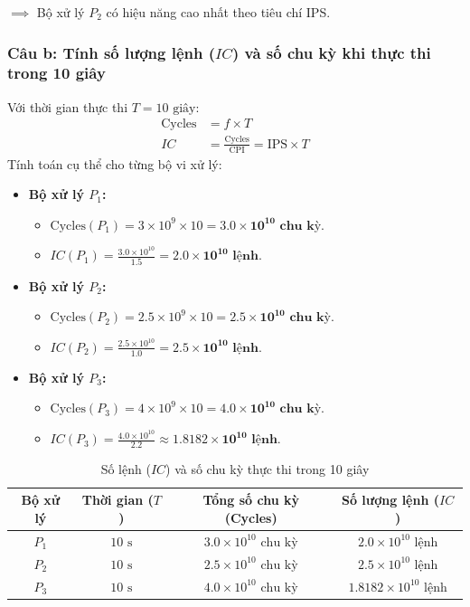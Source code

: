 \documentclass[a4paper]{article}
\numberwithin{figure}{section}
\numberwithin{table}{section}
\begin{document}
\noindent $\implies$ Bộ xử lý \textbf{$P_2$} có hiệu năng cao nhất theo tiêu chí IPS.

\subsubsection*{Câu b: Tính số lượng lệnh ($IC$) và số chu kỳ khi thực thi trong 10 giây}
Với thời gian thực thi $T = 10\text{ giây}$:
\begin{align*}
    \text{Cycles} &= f \times T \\
    IC &= \frac{\text{Cycles}}{\text{CPI}} = \text{IPS} \times T
\end{align*}
Tính toán cụ thể cho từng bộ vi xử lý:
\begin{itemize}[leftmargin=*]
    \item \textbf{Bộ xử lý $P_1$:}
    \begin{itemize}
        \item $\text{Cycles}(P_1) = 3 \times 10^9 \times 10 = \mathbf{3.0 \times 10^{10}\text{ chu kỳ}}$.
        \item $IC(P_1) = \frac{3.0 \times 10^{10}}{1.5} = \mathbf{2.0 \times 10^{10}\text{ lệnh}}$.
    \end{itemize}
    \item \textbf{Bộ xử lý $P_2$:}
    \begin{itemize}
        \item $\text{Cycles}(P_2) = 2.5 \times 10^9 \times 10 = \mathbf{2.5 \times 10^{10}\text{ chu kỳ}}$.
        \item $IC(P_2) = \frac{2.5 \times 10^{10}}{1.0} = \mathbf{2.5 \times 10^{10}\text{ lệnh}}$.
    \end{itemize}
    \item \textbf{Bộ xử lý $P_3$:}
    \begin{itemize}
        \item $\text{Cycles}(P_3) = 4 \times 10^9 \times 10 = \mathbf{4.0 \times 10^{10}\text{ chu kỳ}}$.
        \item $IC(P_3) = \frac{4.0 \times 10^{10}}{2.2} \approx \mathbf{1.8182 \times 10^{10}\text{ lệnh}}$.
    \end{itemize}
\end{itemize}

\begin{table}[H]
    \centering
    \caption{Số lệnh ($IC$) và số chu kỳ thực thi trong 10 giây}
    \label{tab:cycles_summary}
    \begin{tabular}{|c|c|c|c|}
        \hline
        \textbf{Bộ xử lý} & \textbf{Thời gian ($T$)} & \textbf{Tổng số chu kỳ (Cycles)} & \textbf{Số lượng lệnh ($IC$)} \\
        \hline
        $P_1$ & $10\text{ s}$ & $3.0 \times 10^{10}\text{ chu kỳ}$ & $2.0 \times 10^{10}\text{ lệnh}$ \\
        \hline
        $P_2$ & $10\text{ s}$ & $2.5 \times 10^{10}\text{ chu kỳ}$ & $2.5 \times 10^{10}\text{ lệnh}$ \\
        \hline
        $P_3$ & $10\text{ s}$ & $4.0 \times 10^{10}\text{ chu kỳ}$ & $1.8182 \times 10^{10}\text{ lệnh}$ \\
        \hline
    \end{tabular}
\end{table}
\end{document}
